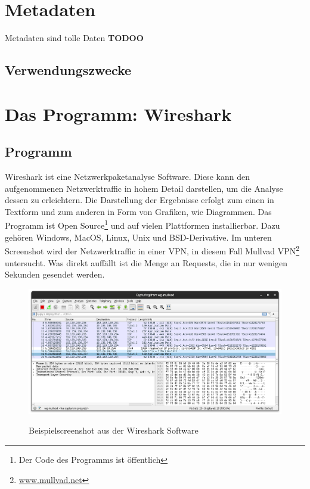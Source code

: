 \documentclass[12pt]{article}
\begin{document}
\section{Metadaten}
Metadaten sind tolle Daten \textbf{TODOO}
\subsection{Verwendungszwecke}



\section{Das Programm: Wireshark}
\subsection{Programm}


Wireshark ist eine Netzwerkpaketanalyse Software. Diese kann den aufgenommenen Netzwerktraffic in hohem Detail darstellen, um die Analyse dessen zu erleichtern. Die Darstellung der Ergebnisse erfolgt zum einen in Textform und zum anderen in Form von Grafiken, wie Diagrammen. Das Programm ist Open Source\footnote{Der Code des Programms ist öffentlich} und auf vielen Plattformen installierbar. Dazu gehören Windows, MacOS, Linux, Unix und BSD-Derivative. Im unteren Screenshot wird der Netzwerktraffic in einer VPN, in diesem Fall Mullvad VPN\footnote{\href{https://www.mullvad.net}{www.mullvad.net}} untersucht. Was direkt auffällt ist die Menge an Requests, die in nur wenigen Sekunden gesendet werden.

\begin{figure}[h]
	\begin{center}
		\includegraphics[scale=0.25]{Bilder/Screenshot_1.png}
		\label{fig:figure2}
		\caption{Beispielscreenshot aus der Wireshark Software}
	\end{center}
\end{figure}
\end{document}
